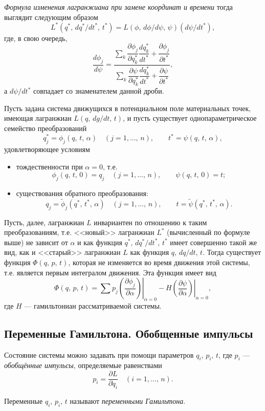 \documentclass[a4paper]{article}
\begin{document}
\emph{Формула изменения лагранжиана при замене координат и времени} тогда
выглядит следующим образом
\[
	L^*(q^*,\,dq^* /dt^*,\,t^*)=L(\phi,\,d\phi /d\psi,\,\psi)(d\psi /dt^*)
,\]
где, в свою очередь,
\[
\frac{d\phi_j}{d\psi}=\dfrac{\displaystyle\sum\limits_{k}
	\dfrac{\partial \phi_j}{\partial q_k^*} 
\dfrac{dq^*_k}{dt^*}+\dfrac{\partial \phi_j}{\partial t^*} }{\displaystyle\sum\limits_{k}
\dfrac{\partial \psi}{\partial q_k^*} 
\dfrac{dq^*_k}{dt^*}+\dfrac{\partial \psi}{\partial t^*} }
,\]
а $d \psi /dt^*$ совпадает со знаменателем данной дроби.
\begin{thm}[Нётер]
	Пусть задана система движущихся в потенциальном поле материальных
	точек, имеющая лагранжиан $L(q,\, dg /dt,\, t)$, и пусть существует
	однопараметрическое семейство преобразований
	\[
		q_j^*=\phi_j(q,\,t,\,\alpha) \quad (j=1,\ldots,\, n),
		\qquad t^*=\psi(q,\,t,\,\alpha),
	\]
	удовлетворяющее условиям
	\begin{itemize}
		\item тождественности при $\alpha=0$, т.\:е.
			\[
				\phi_j(q,\,t,\,0)=q_j \quad(j=1,\ldots,\,n),
				\qquad \psi(q,\,t,\,0)=t;
			\]
		\item существования обратного преобразования:
			\[
				q_j= \tilde{\phi}_j(q^*,\,t^*,\,\alpha) \quad
				(j=1,\ldots,\,n), \qquad
				t=\tilde{\psi}(q^*,\,t^*,\,\alpha)
			.\] 
	\end{itemize}
	Пусть, далее, лагранжиан $L$ инвариантен по отношению к таким
	преобразованиям,  т.\:е. <<новый>> лагранжиан  $L^*$ (вычисленный по
	формуле выше) не зависит от $\alpha$ и как функция $q^*,\,dq^* /dt^*,\,
	t^*$ имеет совершенно такой же вид, как и <<старый>> лагранжиан
	$L$ как функция $q,\,dq /dt,\,t$. Тогда существует функция $\Phi(q,\,p,\,t)$,
	которая не изменяется во время движения этой системы, т.\:е.
	является первым интегралом движения. Эта функция имеет вид
	\[
		\Phi(q,\,p,\,t)= \sum p_j \left.\left(\frac{\partial \phi_j}{\partial \alpha}
			\right)\right|_{\alpha=0}-H\left.\left( \frac{\partial
			\psi}{\partial \alpha}  \right) \right|_{\alpha=0}
	,\] 
	где $H$ --- гамильтониан рассматриваемой системы.
\end{thm}
\subsection{Переменные Гамильтона. Обобщенные импульсы}
Состояние системы можно задавать при помощи параметров $q_i,\,p_i,\,t$, где
 $p_i$ --- \emph{обобщённые импульсы}, определяемые равенствами
 \[
	 p_i=\frac{\partial L}{\partial \dot{q}_i} \quad (i=1,\ldots,\,n)
 .\] 
\begin{dfn}
	Переменные $q_i,\,p_i,\,t$ называют \emph{переменными Гамильтона}.
\end{dfn}
\end{document}
